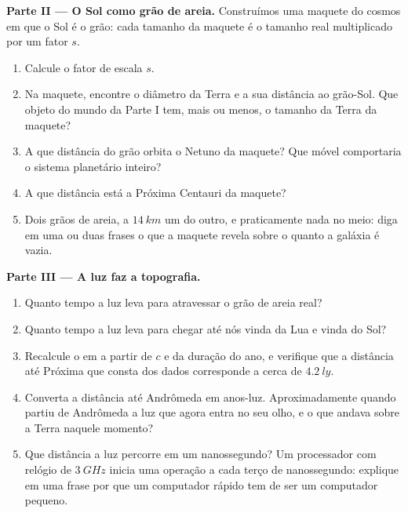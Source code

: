 \begin{problem}
\medskip
\noindent\textbf{Parte II --- O Sol como grão de areia.}
Construímos uma maquete do cosmos em que o Sol é o grão: cada tamanho da
maquete é o tamanho real multiplicado por um fator $s$.
\begin{enumerate}[resume]
  \item Calcule o fator de escala $s$.
  \item Na maquete, encontre o diâmetro da Terra e a sua distância ao
        grão-Sol. Que objeto do mundo da Parte I tem, mais ou menos, o
        tamanho da Terra da maquete?
  \item A que distância do grão orbita o Netuno da maquete? Que móvel
        comportaria o sistema planetário inteiro?
  \item A que distância está a Próxima Centauri da maquete?
  \item Dois grãos de areia, a $\qty{14}{km}$ um do outro, e
        praticamente nada no meio: diga em uma ou duas frases o que a
        maquete revela sobre o quanto a galáxia é vazia.
\end{enumerate}

\medskip
\noindent\textbf{Parte III --- A luz faz a topografia.}
\begin{enumerate}[resume]
  \item Quanto tempo a luz leva para atravessar o grão de areia real?
  \item Quanto tempo a luz leva para chegar até nós vinda da Lua e vinda
        do Sol?
  \item Recalcule o  em  a partir de $c$ e da duração do
        ano, e verifique que a distância até Próxima que consta dos
        dados corresponde a cerca de $\qty{4.2}{ly}$.
  \item Converta a distância até Andrômeda em anos-luz. Aproximadamente
        quando partiu de Andrômeda a luz que agora entra no seu olho, e
        o que andava sobre a Terra naquele momento?
  \item Que distância a luz percorre em um nanossegundo? Um processador
        com relógio de $\qty{3}{GHz}$ inicia uma operação a cada terço
        de nanossegundo: explique em uma frase por que um computador
        rápido tem de ser um computador pequeno.
\end{enumerate}


\end{problem}

